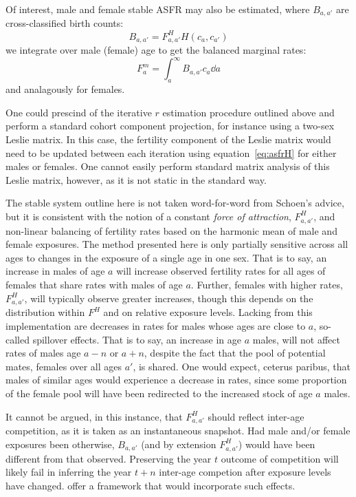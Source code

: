 Of interest, male and female stable ASFR may also be estimated, where
$B_{a,a'}$ are cross-classified birth counts:
\begin{equation}
B_{a,a'} = F_{a,a'}^H H(c_a,c_{a'})
\end{equation}
we integrate over male (female) age to get the balanced marginal rates:
\begin{equation}
\label{eq:asfrH}
F_a^m = \int_a ^\infty B_{a,a'} c_a \dd a
\end{equation}
and analagously for females. 

One could prescind of the iterative $r$ estimation procedure outlined above and
perform a standard cohort component projection, for instance using a
two-sex Leslie matrix. In this case, the fertility component of the Leslie
matrix would need to be updated between each iteration using equation~\ref{eq:asfrH} for either
males or females. One cannot easily perform standard matrix analysis of this
Leslie matrix, however, as it is not static in the standard way.

The stable system outline here is not taken word-for-word from Schoen's advice,
but it is consistent with the notion of a constant \textit{force of attraction},
$F_{a,a'}^H$, and non-linear balancing of fertility rates based on the harmonic
mean of male and female exposures. The method presented here is only partially
sensitive across all ages to changes in the exposure of a single age in one sex.
That is to say, an increase in males of age $a$ will increase observed fertility rates for all ages
of females that share rates with males of age $a$. Further, females with
higher rates, $F_{a,a'}^H$, will typically observe greater increases, though this
depends on the distribution within $F^H$ and on relative exposure levels.
Lacking from this implementation are decreases in rates for males whose ages are close
to $a$, so-called spillover effects\citep{choo2006estimating}. That is to say,
an increase in age $a$ males, will not affect rates of males age $a-n$ or $a+n$, 
despite the fact that the pool of potential mates, females over
all ages $a'$, is shared. One would expect, ceterus paribus, that males of
similar ages would experience a decrease in rates, since some proportion of the
female pool will have been redirected to the increased stock of age $a$ males.

It cannot be argued, in this instance, that $F_{a,a'}^H$ should reflect
inter-age competition, as it is taken as an instantaneous snapshot. Had male and/or female
exposures been otherwise, $B_{a,a'}$ (and by extension $F_{a,a'}^H$) would have
been different from that observed. Preserving the year $t$ outcome of
competition will likely fail in inferring the year $t+n$ inter-age competion
after exposure levels have changed. \citet{choo2006estimating} offer a framework
that would incorporate such effects.





